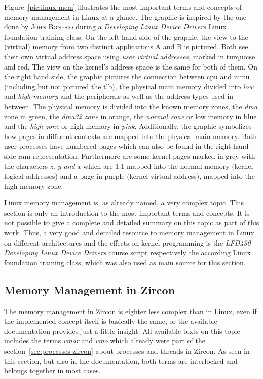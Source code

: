 Figure~\ref{pic:linux-mem} illustrates the most important terms and concepts of memory management in Linux at a glance.
The graphic is inspired by the one done by \textsc{John Bonesio} during a \textit{Developing Linux Device Drivers} Linux foundation training class.
On the left hand side of the graphic, the view to the (virtual) memory from two distinct applications A and B is pictured.
Both see their own virtual address space using \textit{user virtual addresses}, marked in turquoise and red.
The view on the kernel's address space is the same for both of them.
On the right hand side, the graphic pictures the connection between \ac{cpu} and \ac{mmu} (including but not pictured the \ac{tlb}),  the physical main memory divided into \textit{low} and \textit{high memory} and the peripherals as well as the address types used in between.
The physical memory is divided into the known memory zones, the \textit{\ac{dma}} zone in green, the \textit{\ac{dma}32 zone} in orange, the \textit{normal zone} or low memory in blue and the \textit{high zone} or high memory in \textit{pink}.
Additionally, the graphic symbolizes how pages in different contexts are mapped into the physical main memory.
Both user processes have numbered pages which can also be found in the right hand side \ac{ram} representation.
Furthermore are some kernel pages marked in grey with the characters \textit{z, y and x} which are 1:1 mapped into the normal memory (kernel logical addresses) and a page in purple (kernel virtual address), mapped into the high memory zone. 

Linux memory management is, as already named, a very complex topic.
This section is only an introduction to the most important terms and concepts.
It is not possible to give a complete and detailed summary on this topic as part of this work.
Thus, a very good and detailed resource to memory management in Linux on different architectures and the effects on kernel programming is the \textit{LFD430 Developing Linux Device Drivers} course script\cite{lfd430} respectively the according Linux foundation training class, which was also used as main source for this section. 
%

\subsection{Memory Management in Zircon} 
The memory management in Zircon is eighter less complex than in Linux, even if the implemented concept itself is basically the same, or the available documentation provides just a little insight.
All available texts on this topic includes the terms \textit{\acf{vmar}} and \textit{\acf{vmo}} which already were part of the section~\ref{sec:processes-zircon} about processes and threads in Zircon.
As seen in this section, but also in the documentation, both terms are interlocked and belongs together in most cases.

